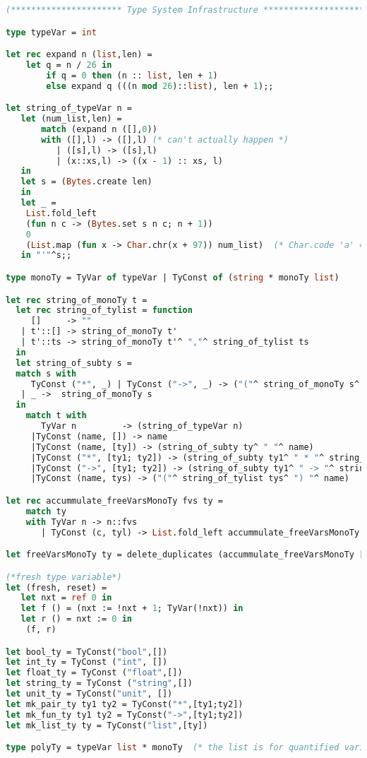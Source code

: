 \begin{lstlisting}[language=Caml, caption=definitions.ml]
(********************** Type System Infrastructure **********************)

type typeVar = int

let rec expand n (list,len) =
    let q = n / 26 in
        if q = 0 then (n :: list, len + 1)
        else expand q (((n mod 26)::list), len + 1);;

let string_of_typeVar n = 
   let (num_list,len) =
       match (expand n ([],0))
       with ([],l) -> ([],l) (* can't actually happen *)
          | ([s],l) -> ([s],l)
          | (x::xs,l) -> ((x - 1) :: xs, l)
   in
   let s = (Bytes.create len)
   in
   let _ =
    List.fold_left
    (fun n c -> (Bytes.set s n c; n + 1))
    0
    (List.map (fun x -> Char.chr(x + 97)) num_list)  (* Char.code 'a' = 97 *)
   in "'"^s;;

type monoTy = TyVar of typeVar | TyConst of (string * monoTy list)

let rec string_of_monoTy t =
  let rec string_of_tylist = function
     []     -> ""
   | t'::[] -> string_of_monoTy t'
   | t'::ts -> string_of_monoTy t'^ ","^ string_of_tylist ts
  in
  let string_of_subty s =
  match s with 
     TyConst ("*", _) | TyConst ("->", _) -> ("("^ string_of_monoTy s^ ")")
   | _ ->  string_of_monoTy s
  in 
    match t with
       TyVar n         -> (string_of_typeVar n)
     |TyConst (name, []) -> name
     |TyConst (name, [ty]) -> (string_of_subty ty^ " "^ name)
     |TyConst ("*", [ty1; ty2]) -> (string_of_subty ty1^ " * "^ string_of_monoTy ty2)
     |TyConst ("->", [ty1; ty2]) -> (string_of_subty ty1^ " -> "^ string_of_monoTy ty2)
     |TyConst (name, tys) -> ("("^ string_of_tylist tys^ ") "^ name)

let rec accummulate_freeVarsMonoTy fvs ty =
    match ty
    with TyVar n -> n::fvs
       | TyConst (c, tyl) -> List.fold_left accummulate_freeVarsMonoTy fvs tyl

let freeVarsMonoTy ty = delete_duplicates (accummulate_freeVarsMonoTy [] ty)

(*fresh type variable*)
let (fresh, reset) =
   let nxt = ref 0 in
   let f () = (nxt := !nxt + 1; TyVar(!nxt)) in
   let r () = nxt := 0 in
    (f, r)

let bool_ty = TyConst("bool",[])
let int_ty = TyConst ("int", [])
let float_ty = TyConst ("float",[])
let string_ty = TyConst ("string",[])
let unit_ty = TyConst("unit", [])
let mk_pair_ty ty1 ty2 = TyConst("*",[ty1;ty2])
let mk_fun_ty ty1 ty2 = TyConst("->",[ty1;ty2])
let mk_list_ty ty = TyConst("list",[ty])

type polyTy = typeVar list * monoTy  (* the list is for quantified variables *)


\end{lstlisting}
